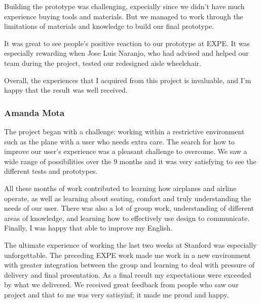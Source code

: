 Building the prototype was challenging, expecially since we didn't have much experience buying tools and materials. But we managed to work through the limitations of materials and knowledge to build our final prototype.

It was great to see people's positive reaction to our prototype at EXPE. It was especially rewarding when Jose Luis Naranjo, who had advised and helped our team during the project, tested our redesigned aisle wheelchair.

Overall, the experiences that I acquired from this project is invaluable, and I'm happy that the result was well received.

\subsubsection{Amanda Mota}

The project began with a challenge: working within a restrictive environment such as the plane with a user who needs extra care. The search for how to improve our user's experience was a pleasant challenge to overcome. We saw a wide range of possibilities over the 9 months and it was very satisfying to see the different tests and prototypes.

All these months of work contributed to learning how airplanes and airline operate, as well as learning about seating, comfort and truly understanding the needs of our user. There was also a lot of group work, understanding of different areas of knowledge, and learning how to effectively use design to communicate. Finally, I was happy that able to improve my English.

The ultimate experience of working the last two weeks at Stanford was especially unforgettable. The preceding EXPE work made me work in a new environment with greater integration between the group and learning to deal with pressure of delivery and final presentation. As a final result my expectations were exceeded by what we delivered. We received great feedback from people who saw our project and that to me was very satisyinf; it made me proud and happy.

